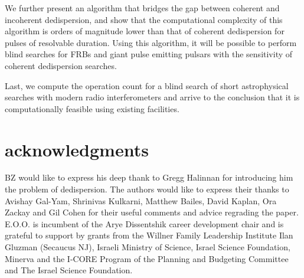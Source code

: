 \documentclass[iop]{emulateapj}
\begin{document}
We further present an algorithm that bridges the gap between coherent and incoherent dedispersion, and show that the computational complexity of this algorithm is orders of magnitude lower than that of coherent dedispersion for pulses of resolvable duration. Using this algorithm, it will be possible to perform blind searches for FRBs and giant pulse emitting pulsars with the sensitivity of coherent dedispersion searches.

Last, we compute the operation count for a blind search of short astrophysical searches with modern radio interferometers and arrive to the conclusion that it is computationally feasible using existing facilities.    

\section*{acknowledgments}
BZ would like to express his deep thank to Gregg Halinnan for introducing him the problem of dedispersion.
The authors would like to express their thanks to Avishay Gal-Yam, Shrinivas Kulkarni, Matthew Bailes, David Kaplan, Ora Zackay and Gil Cohen for their useful comments and advice regrading the paper.
E.O.O. is incumbent of
the Arye Dissentshik career development chair and
is grateful to support by
grants from the 
Willner Family Leadership Institute
Ilan Gluzman (Secaucus NJ),
Israeli Ministry of Science,
Israel Science Foundation,
Minerva and
the I-CORE Program of the Planning
and Budgeting Committee and The Israel Science Foundation. 
\end{document}
